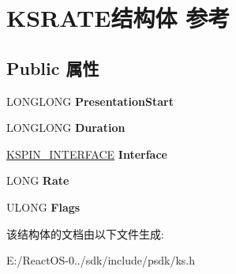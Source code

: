 \hypertarget{struct_k_s_r_a_t_e}{}\section{K\+S\+R\+A\+T\+E结构体 参考}
\label{struct_k_s_r_a_t_e}
\subsection*{Public 属性}
\begin{DoxyCompactItemize}
\item 
\mbox{\label{struct_k_s_r_a_t_e_a673440bbf1666ffc11037efa7eb1a5c4}} 
L\+O\+N\+G\+L\+O\+NG {\bfseries Presentation\+Start}
\item 
\mbox{\label{struct_k_s_r_a_t_e_a0859d9ed92e8f760e1dcb4fab5d78cb9}} 
L\+O\+N\+G\+L\+O\+NG {\bfseries Duration}
\item 
\mbox{\label{struct_k_s_r_a_t_e_a655776cb0b496e7250a982dd3b96d373}} 
\hyperlink{struct_k_s_i_d_e_n_t_i_f_i_e_r}{K\+S\+P\+I\+N\+\_\+\+I\+N\+T\+E\+R\+F\+A\+CE} {\bfseries Interface}
\item 
\mbox{\label{struct_k_s_r_a_t_e_a0a82bb725433fcbe5576284e060dc565}} 
L\+O\+NG {\bfseries Rate}
\item 
\mbox{\label{struct_k_s_r_a_t_e_a923895bbb2239bc347876c9c8757b951}} 
U\+L\+O\+NG {\bfseries Flags}
\end{DoxyCompactItemize}


该结构体的文档由以下文件生成\+:\begin{DoxyCompactItemize}
\item 
E\+:/\+React\+O\+S-\/0../sdk/include/psdk/ks.\+h\end{DoxyCompactItemize}
